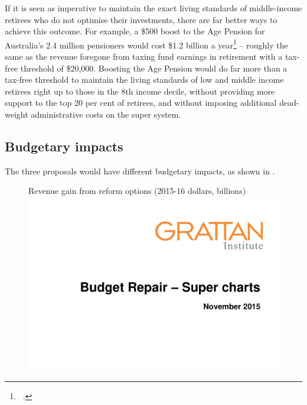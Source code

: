 \documentclass{grattanAlpha}
\begin{document}
If it is seen as imperative to maintain the exact living standards of middle-income retirees who do not optimise their investments, there are far better ways to achieve this outcome. For example, a \$500 boost to the Age Pension for Australia’s 2.4 million pensioners would cost \$1.2 billion a year\footnote{\gao\ \textcite{NationalCommissionAudit2014}.}  – roughly the same as the revenue foregone from taxing fund earnings in retirement with a tax-free threshold of \$20,000. Boosting the Age Pension would do far more than a tax-free threshold to maintain the living standards of low and middle income retirees right up to those in the 8th income decile, without providing more support to the top 20 per cent of retirees, and without imposing additional dead-weight administrative costs on the super system.

\subsection{Budgetary impacts}
The three proposals would have different budgetary impacts, as shown in .  

\begin{figure}
%
{Revenue gain from reform options (2015-16 dollars, billions)}
\includegraphics[width=\columnwidth,page=33]{super-atlas/PPTX.pdf}

\end{figure}
\end{document}
